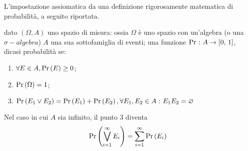 \documentclass{subfiles}
\begin{document}
L'impostazione assiomatica da una definizione rigorosamente matematica di probabilità, a seguito riportata.
\begin{Definition*}
    dato \((\Omega, A)\) uno spazio di misura: ossia \(\Omega\) è uno spazio con un'algebra (o una \(\sigma-algebra\))   \(A\) una sua sottofamiglia di eventi;
    una funzione \(\Pr \Such A \to \Range*{0}{1}\), dicasi probabilità se:
    \begin{enumerate}
        \item \(\forall E \in A, \Prob{E} \ge 0\);
        \item \(\Prob{\Omega} = 1\);
        \item \(\Prob{E_{1} \lor E_{2}} = \Prob{E_{1}} + \Prob{E_{2}}, \forall E_{1}, E_{2} \in A \Such E_{1}E_{2} = \varnothing\)
    \end{enumerate}
    Nel caso in cui \(A\) sia infinito, il punto 3 diventa
    \[
        \Prob{\Bigvee{E_{i}}{i = 1}[\infty]} = \Sum{\Prob{E_{i}}}{i = 1}[\infty]
    \]
\end{Definition*}
\end{document}
